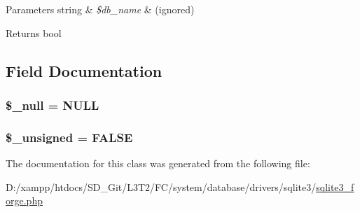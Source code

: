 \begin{DoxyParams}[1]{Parameters}
string & {\em \$db\+\_\+name} & (ignored) \\
\hline
\end{DoxyParams}
\begin{DoxyReturn}{Returns}
bool 
\end{DoxyReturn}


\subsection{Field Documentation}
\hypertarget{class_c_i___d_b__sqlite3__forge_ae58fe6a5104d4a069a49b27533ce808f}{}
\subsubsection[{\$\+\_\+null}]{\setlength{\rightskip}{0pt plus 5cm}\$\+\_\+null = \textquotesingle{}N\+U\+L\+L\textquotesingle{}\hspace{0.3cm}{\ttfamily [protected]}}\label{class_c_i___d_b__sqlite3__forge_ae58fe6a5104d4a069a49b27533ce808f}
\hypertarget{class_c_i___d_b__sqlite3__forge_aae977ae6d61fa183f0b25422b6ddc31c}{}
\subsubsection[{\$\+\_\+unsigned}]{\setlength{\rightskip}{0pt plus 5cm}\$\+\_\+unsigned = F\+A\+L\+S\+E\hspace{0.3cm}{\ttfamily [protected]}}\label{class_c_i___d_b__sqlite3__forge_aae977ae6d61fa183f0b25422b6ddc31c}


The documentation for this class was generated from the following file\+:\begin{DoxyCompactItemize}
\item 
D\+:/xampp/htdocs/\+S\+D\+\_\+\+Git/\+L3\+T2/\+F\+C/system/database/drivers/sqlite3/\hyperlink{sqlite3__forge_8php}{sqlite3\+\_\+forge.\+php}\end{DoxyCompactItemize}
